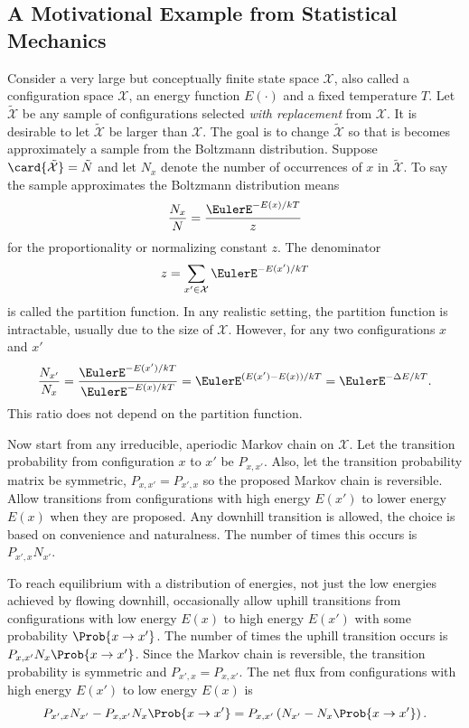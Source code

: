 \documentclass[12pt]{article}
\begin{document}
\subsection*{A Motivational Example from Statistical Mechanics}

Consider a very large but conceptually finite state space \( \mathcal{X}
\), also called a configuration space \( \mathcal{X} \),%
an energy function \( E(\cdot) \) and a fixed temperature \( T \).  Let \(
\tilde{\mathcal{X}} \) be any sample of configurations selected \emph{with
replacement} from \( \mathcal{X} \).  It is desirable to let \( \tilde{\mathcal
{X}} \) be larger than \( \mathcal{X} \).  The goal is to change \(
\tilde{\mathcal{X}} \) so that is becomes approximately a sample from
the Boltzmann distribution.%
Suppose \( \card{\tilde{\mathcal{X}}} = \tilde{N} \) and let \( N_{x} \)
denote the number of occurrences of \( x \) in \( \tilde{\mathcal{X}} \).
To say the sample approximates the Boltzmann distribution means
\[
    \frac{N_{x}}{N} = \frac{\EulerE^{-E(x)/kT}}{z}
\] for the proportionality or normalizing constant \( z \).  The
denominator
\[
    z = \sum\limits_{x' \in \mathcal{X}} \EulerE^{-E(x')/kT}
\] is called the partition function.%
In any realistic setting, the partition function is intractable, usually
due to the size of \( \mathcal{X} \).  However, for any two
configurations \( x \) and \( x' \)
\begin{equation}
    \label{eq:montecarlo:boltzmandiff} \frac{N_{x'}}{N_{x}} = \frac{\EulerE^
    {-E(x')/kT}}{\EulerE^{-E(x)/kT}} = \EulerE^{(E(x')-E(x))/kT} =
    \EulerE^{-\Delta E/kT}.
\end{equation}
This ratio does not depend on the partition function.

Now start from any irreducible, aperiodic Markov chain on \( \mathcal{X}
\).  Let the transition probability from configuration \( x \) to \( x' \)
be \( P_{x, x'} \).  Also, let the transition probability matrix be
symmetric, \( P_{x, x'} = P_{x', x} \) so the proposed Markov chain is
reversible.  Allow transitions from configurations with high energy \( E
(x') \) to lower energy \( E(x) \) when they are proposed.  Any downhill
transition is allowed, the choice is based on convenience and
naturalness.  The number of times this occurs is \( P_{x', x} N_{x'} \).

To reach equilibrium with a distribution of energies, not just the low
energies achieved by flowing downhill, occasionally allow uphill
transitions from configurations with low energy \( E(x) \) to high
energy \( E(x') \) with some probability \( \Prob{x \to x'} \).  The
number of times the uphill transition occurs is \( P_{x, x'} N_{x}\Prob{x
\to x'} \).  Since the Markov chain is reversible, the transition
probability is symmetric and \( P_{x', x} = P_{x, x'} \).  The net flux
from configurations with high energy \( E(x') \) to low energy \( E(x) \)
is
\begin{equation}
    \label{eq:montecarlo:netflux} P_{x', x} N_{x'} - P_{x,x'}N_x \Prob{x
    \to x'} = P_{x, x'} \left( N_{x'} - N_{x} \Prob{x \to x'}\right).
\end{equation}
\end{document}
